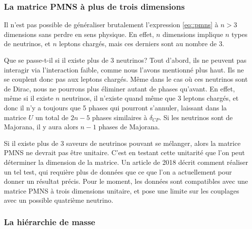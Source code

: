 	        \subsubsection{La matrice PMNS à plus de trois dimensions}
            Il n'est pas possible de généraliser brutalement l'expression \eqref{eq::pmns} à $n>3$ dimensions sans perdre en sens physique. En effet, $n$ dimensions implique $n$ types de neutrinos, et $n$ leptons chargés, mais ces derniers sont au nombre de 3.
            
            Que se passe-t-il si il existe plus de 3 neutrinos? Tout d'abord, ils ne peuvent pas interagir via l'interaction faible, comme nous l'avons mentionné plus haut. Ils ne se couplent donc pas aux leptons chargés. Même dans le cas où ces neutrinos sont de Dirac, nous ne pourrons plus éliminer autant de phases qu'avant. En effet, même si il existe $n$ neutrinos, il n'existe quand même que 3 leptons chargés, et donc il n'y a toujours que 5 phases qui pourront s'annuler, laissant dans la matrice $U$ un total de $2n-5$ phases similaires à $\delta_{CP}$. Si les neutrinos sont de Majorana, il y aura alors $n-1$ phases de Majorana.
            
            Si il existe plus de 3 saveurs de neutrinos pouvant se mélanger, alors la matrice PMNS ne devrait pas être unitaire. C'est en testant cette unitarité que l'on peut déterminer la dimension de la matrice. Un article de 2018\cite{Qian2013} décrit comment réaliser un tel test, qui requière plus de données que ce que l'on a actuellement pour donner un résultat précis. Pour le moment, les données sont compatibles avec une matrice PMNS à trois dimensions unitaire, et pose une limite sur les couplages avec un possible quatrième neutrino.
            
        
	        \subsubsection{La hiérarchie de masse}\label{sec::hierarchy}
	        
